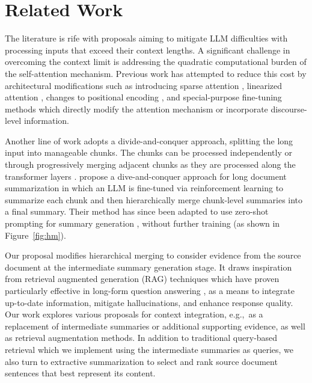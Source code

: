 \section{Related Work}
\label{sec:related_work}


The literature is rife with proposals aiming to  mitigate LLM difficulties with processing inputs that exceed their context lengths. A significant challenge in overcoming the context limit is addressing the quadratic computational
burden of the self-attention mechanism. Previous work has 
attempted to reduce this cost by architectural modifications such as introducing sparse attention \cite{child2019generatinglongsequencessparse,beltagy2020longformerlongdocumenttransformer}, linearized attention \cite{katharopoulos:ea:2020},  changes to positional encoding \cite{peng2023yarnefficientcontextwindow,chen2023extendingcontextwindowlarge},  and special-purpose fine-tuning methods which directly modify the attention mechanism \cite{chen2024longloraefficientfinetuninglongcontext}  or incorporate discourse-level information. %

Another line of work adopts a divide-and-conquer approach, splitting the long input into manageable chunks. The chunks can be processed independently \cite{wang2023augmentinglanguagemodelslongterm,bertsch2023unlimiformer} or through progressively merging adjacent chunks as they
are processed along the transformer layers \cite{song2024hierarchicalcontextmergingbetter}. 
\citet{Wu2021RecursivelySB} propose a dive-and-conquer approach for long document summarization in which an LLM is fine-tuned via reinforcement learning to summarize each chunk and then hierarchically merge
chunk-level summaries  into a final summary. Their method has since been adapted to use zero-shot prompting for summary generation \cite{chang2024booookscore, fables-2024-kim-et-al}, without further training (as shown in Figure~\ref{fig:hm}). 

Our proposal modifies hierarchical merging to consider evidence from the source document at the intermediate summary generation stage. It draws inspiration from retrieval augmented generation (RAG) techniques which have proven particularly effective in long-form question answering \cite{lewis2020rag, izacard-grave-2021-leveraging,xu2024retrievalmeetslongcontext,edge2024localglobalgraphrag}, as a means to integrate up-to-date information, mitigate hallucinations, and enhance response quality. Our work explores various proposals for context integration, e.g.,~as a replacement of  intermediate summaries or additional supporting evidence, as well as retrieval augmentation methods. In addition to traditional query-based retrieval which we implement using the intermediate summaries as queries, we also turn to extractive summarization to select and rank source document sentences that best represent its content.  

